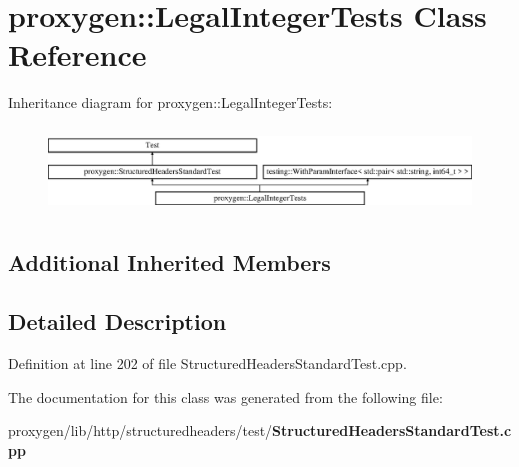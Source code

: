 \section{proxygen\+:\+:Legal\+Integer\+Tests Class Reference}
\label{classproxygen_1_1LegalIntegerTests}
Inheritance diagram for proxygen\+:\+:Legal\+Integer\+Tests\+:\begin{figure}[H]
\begin{center}
\leavevmode
\includegraphics[height=2.314050cm]{classproxygen_1_1LegalIntegerTests}
\end{center}
\end{figure}
\subsection*{Additional Inherited Members}


\subsection{Detailed Description}


Definition at line 202 of file Structured\+Headers\+Standard\+Test.\+cpp.



The documentation for this class was generated from the following file\+:\begin{DoxyCompactItemize}
\item 
proxygen/lib/http/structuredheaders/test/{\bf Structured\+Headers\+Standard\+Test.\+cpp}\end{DoxyCompactItemize}
